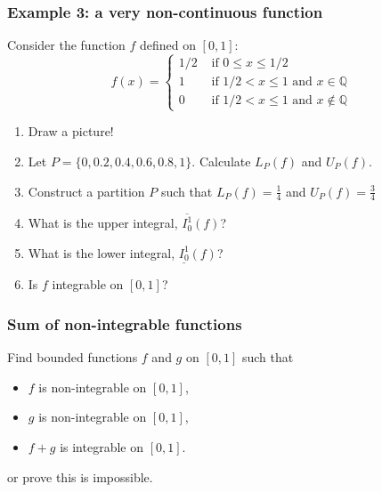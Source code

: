\begin{frame}[t]
	\fontsize{13}{13}\selectfont
	\frametitle{Example 3: a very non-continuous function}

	Consider the function $f$ defined on $[0,1]$:
	\[
		f(x) =
		\begin{cases}
			1/2 & \text{ if } 0 \leq x \leq 1/2                               \\
			1   & \text{ if } 1/2 < x \leq 1 \text{ and } x \in \mathbb{Q}    \\
			0   & \text{ if } 1/2 < x \leq 1 \text{ and } x \notin \mathbb{Q}
		\end{cases}
	\]

	\begin{enumerate}
		\item Draw a picture!

		\item Let $\displaystyle P= \{ 0, 0.2, 0.4, 0.6, 0.8, 1 \}$. Calculate
			$\displaystyle L_{P}(f)$ and $\displaystyle U_{P}(f)$.

		\item Construct a partition $P$ such that $\displaystyle L_{P}(f) = \frac{1}{4}$
			and $\displaystyle U_{P}(f) = \frac{3}{4}$

		\item What is the upper integral, $\overline{I_0^1}(f)$?

		\item What is the lower integral, $\underline{I_0^1}(f)$?

		\item Is $f$ integrable on $[0,1]$?
	\end{enumerate}
\end{frame}

\begin{frame}[t]
	\frametitle{Sum of non-integrable functions}

	Find bounded functions $f$ and $g$ on $[0,1]$ such that
	\begin{itemize}
		\item $f$ is non-integrable on $[0,1]$,

		\item $g$ is non-integrable on $[0,1]$,

		\item $f+g$ is integrable on $[0,1]$.
	\end{itemize}
	or prove this is impossible.
\end{frame}

